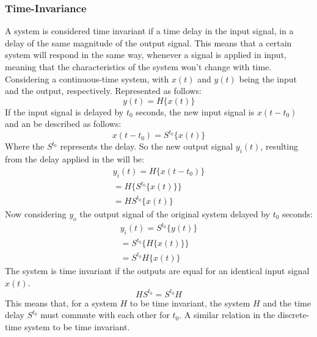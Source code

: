 \subsubsection*{Time-Invariance}
A system is considered time invariant if a time delay in the input signal, in a delay of the same magnitude of the output signal. This means that a certain system will respond in the same way, whenever a signal is applied in input, meaning that the characteristics of the system won't change with time. Considering a continuous-time system, with $x(t)$ and $y(t)$ being the input and the output, respectively. Represented as follows:
\begin{equation}
    y(t) = H\{x(t)\}
\end{equation} 
If the input signal is delayed by $t_0$ seconds, the new input signal is $x(t-t_0)$ and an be described as follows:
\begin{equation}
    x(t-t_0) = S^{t_0}\{x(t)\}
\end{equation}
Where the $S^{t_0}$ represents the delay. So the new output signal $y_i(t)$, resulting from the delay applied in the will be:
\begin{equation}
    \begin{aligned}
        y_i(t) = H\{x(t-t_0)\}\\
        = H\{S^{t_0}\{x(t)\}\}\\
        =HS^{t_0}\{x(t)\}    
    \end{aligned}
\end{equation}
Now considering $y_o$ the output signal of the original system delayed by $t_0$ seconds: 
\begin{equation}
    \begin{aligned}
        y_i(t) = S^{t_0}\{y(t)\}\\
        = S^{t_0}\{H\{x(t)\}\}\\
        =S^{t_0}H\{x(t)\}    
    \end{aligned}
\end{equation}
The system is time invariant if the outputs are equal for an identical input signal $x(t)$. 
\begin{equation}
    HS^{t_0} = S^{t_0}H
\end{equation}
This means that, for a system $H$ to be time invariant, the system $H$ and the time delay $S^{t_0}$ must commute with each other for $t_0$. A similar relation in the discrete-time system to be time invariant.  
